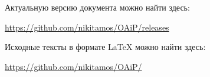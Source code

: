 \documentclass[12pt, a4paper]{extarticle}
\begin{document}
\clearpage\maketitle
\thispagestyle{empty}

\vfill

\begin{center}
  Актуальную версию документа можно найти здесь:

  \url{https://github.com/nikitamos/OAiP/releases}

  \vspace{5mm}
  Исходные тексты в формате \LaTeX{} можно найти здесь:

  \url{https://github.com/nikitamos/OAiP/}
\end{center}



\normalsize
\newpage
\tableofcontents
\newpage


\end{document}
